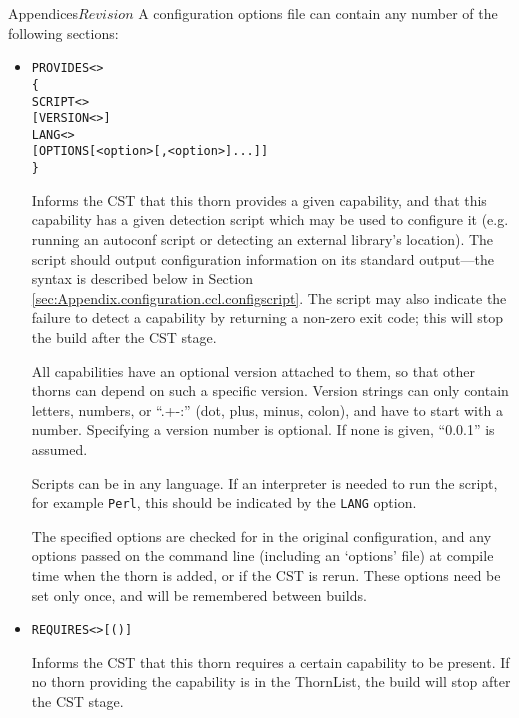 \begin{cactuspart}{Appendices}{}{$Revision$}
A configuration options file can contain any number of the following
sections:

\begin{itemize}

\item

\begin{alltt}
PROVIDES <>
\{
  SCRIPT <>
  [VERSION <>]
  LANG <>
  [OPTIONS [<option>[,<option>]...]]
\}
\end{alltt}

Informs the CST that this thorn provides a given capability, and that
this capability has a given detection script which may be used to
configure it (e.g. running an autoconf script or detecting an external
library's location).  The script should output configuration
information on its standard output---the syntax is described below
in Section \ref{sec:Appendix.configuration.ccl.configscript}.  The
script may also indicate the failure to detect a capability by
returning a non-zero exit code;  this will stop the build after the
CST stage.

All capabilities have an optional version attached to them, so that other
thorns can depend on such a specific version. Version strings can only contain
letters, numbers, or ``.+-:'' (dot, plus, minus, colon), and have to start with
a number. Specifying a version number is optional. If none is given, ``0.0.1''
is assumed.

Scripts can be in any language.  If an interpreter is needed to run
the script, for example \verb|Perl|, this should be indicated by the
\verb|LANG| option.

The specified options are checked for in the original configuration,
and any options passed on the command line (including an `options'
file) at compile time when the thorn is added, or if the CST is
rerun.  These options need be set only once, and will be remembered
between builds.

\item

\begin{alltt}
REQUIRES  <> [( )]
\end{alltt}

Informs the CST that this thorn requires a certain capability to be
present.  If no thorn providing the capability is in the ThornList,
the build will stop after the CST stage.


\end{itemize}
\end{cactuspart}
